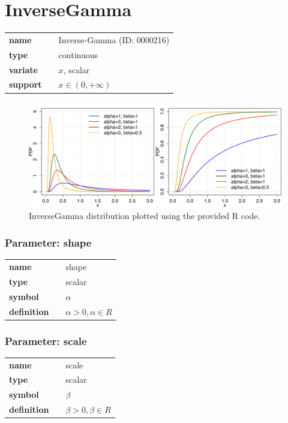 \section*{InverseGamma} 

  \bigskip 

\begin{tabular}{p{2cm}cl}
\textbf{name} & & Inverse-Gamma (ID: 0000216)\\ 
 
\textbf{type} & & continuous \\ 

\textbf{variate} & & $x$, scalar \\ 

\textbf{support} & & $x \in (0,+\infty)$
\end{tabular}

\begin{figure}[ht!]
\centering
  \includegraphics[width=140mm]{pics/InverseGamma.pdf}
 \caption{InverseGamma distribution plotted using the provided R code.}
 \label{fig:InverseGamma}
\end{figure}

\subsubsection*{Parameter: shape}

\noindent\begin{tabular}{p{2cm}cl}
\textbf{name} & & shape \\
\textbf{type} & & scalar \\
\textbf{symbol} & & $\alpha$  \\
\textbf{definition} & & $\alpha>0, \alpha \in  R$
\end{tabular}
\subsubsection*{Parameter: scale}

\noindent\begin{tabular}{p{2cm}cl}
\textbf{name} & & scale \\
\textbf{type} & & scalar \\
\textbf{symbol} & & $\beta$  \\
\textbf{definition} & & $\beta>0, \beta \in  R$
\end{tabular}

